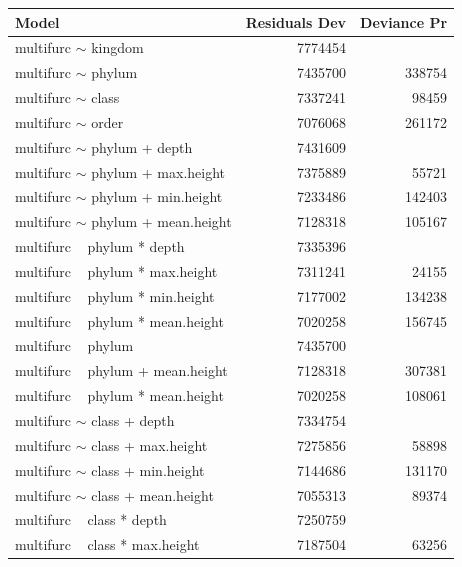         \begin{center}
          \begin{longtable}{ |l|r|r| }
            \hline
            Model & Residuals Dev & Deviance Pr \\
            \hline \hline
            multifurc $\sim$ kingdom & 7774454 & \\
            multifurc $\sim$ phylum & 7435700 & 338754 \\
            multifurc $\sim$ class & 7337241 & 98459 \\
            \rowcolor{green!50} multifurc $\sim$ order & 7076068 & 261172 \\
            \hline \hline \hline
            multifurc $\sim$ phylum + depth & 7431609 & \\
            multifurc $\sim$ phylum + max.height & 7375889 & 55721 \\
            multifurc $\sim$ phylum + min.height & 7233486 & 142403 \\
            \rowcolor{green!50} multifurc $\sim$ phylum + mean.height & 7128318 & 105167 \\
            \hline \hline
            multifurc ~ phylum * depth & 7335396 & \\
            multifurc ~ phylum * max.height & 7311241 & 24155 \\
            multifurc ~ phylum * min.height & 7177002 & 134238 \\
            \rowcolor{green!50} multifurc ~ phylum * mean.height & 7020258 & 156745 \\
            \hline \hline
            multifurc ~ phylum & 7435700 & \\
            multifurc ~ phylum + mean.height & 7128318 & 307381 \\
            \rowcolor{green!50} multifurc ~ phylum * mean.height & 7020258 & 108061 \\
            \hline \hline \hline
            multifurc $\sim$ class + depth & 7334754 & \\
            multifurc $\sim$ class + max.height & 7275856 & 58898 \\
            multifurc $\sim$ class + min.height & 7144686 & 131170 \\
            \rowcolor{green!50} multifurc $\sim$ class + mean.height & 7055313 & 89374 \\
            \hline \hline
            multifurc ~ class * depth & 7250759 & \\
            multifurc ~ class * max.height & 7187504 & 63256 \\

\end{longtable}
\end{center}
